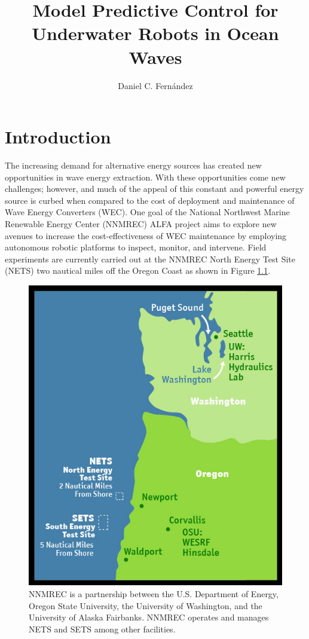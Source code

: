 \documentclass[double,12pt]{beavtex}
\title{Model Predictive Control for Underwater Robots in Ocean Waves}
\author{Daniel C. Fernández}
\begin{document}
\maketitle
\mainmatter


\chapter{Introduction}

The increasing demand for alternative energy sources has created new opportunities in wave energy extraction. With these opportunities come new challenges; however, and much of the appeal of this constant and powerful energy source is curbed when compared to the cost of deployment and maintenance of Wave Energy Converters (WEC). One goal of the National Northwest Marine Renewable Energy Center (NNMREC) ALFA project aims to explore new avenues to increase the cost-effectiveness of WEC maintenance by employing autonomous robotic platforms to inspect, monitor, and intervene. Field experiments are currently carried out at the NNMREC North Energy Test Site (NETS) two nautical miles off the Oregon Coast as shown in Figure \ref{fig:nets}. 

\begin{figure}[h!]
\begin{center}
\includegraphics[width=0.5\columnwidth]{nets}
\caption{NNMREC is a partnership between the U.S. Department of Energy, Oregon State University, the University of Washington, and the University of Alaska Fairbanks. NNMREC operates and manages NETS and SETS among other facilities.}
\label{fig:nets}
\end{center}
\end{figure}
\end{document}
